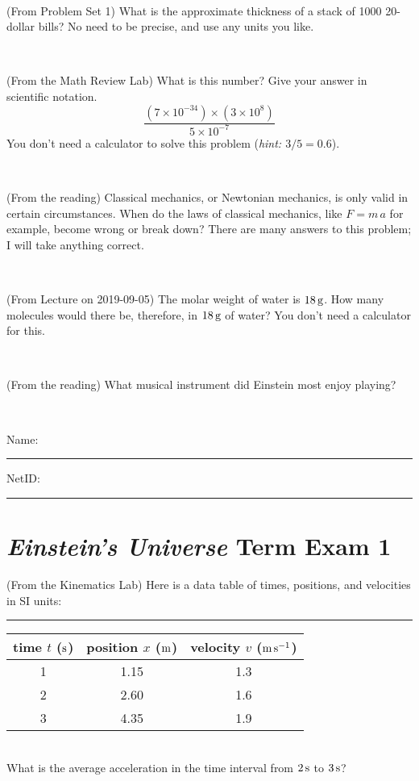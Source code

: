 \documentclass[12pt, letterpaper]{article}
\begin{document}
\vfill ~

\begin{problem} (From Problem Set 1)
What is the approximate thickness of a stack of 1000 20-dollar bills?
No need to be precise, and use any units you like.
\end{problem}


\vfill ~


\clearpage


\begin{problem} (From the Math Review Lab)
What is this number? Give your answer in scientific notation.
$$
\frac{(7\times10^{-34})\times(3\times10^8)}{5\times10^{-7}}
$$
You don't need a calculator to solve this problem (\textit{hint: $3/5=0.6$}).
\end{problem}


\vfill ~

\begin{problem} (From the reading)
Classical mechanics, or Newtonian mechanics, is only valid in certain
circumstances. When do the laws of classical mechanics, like $F =
m\,a$ for example, become wrong or break down? There are many answers
to this problem; I will take anything correct.
\end{problem}


\vfill ~

\begin{problem} (From Lecture on 2019-09-05)
The molar weight of water is $18\,\mathrm{g}$. How many molecules would there
be, therefore, in $18\,\mathrm{g}$ of water? You don't need a calculator for
this.
\end{problem}


\vfill ~

\begin{problem} (From the reading)
What musical instrument did Einstein most enjoy playing?
\end{problem}


\vfill ~


\cleardoublepage



\noindent
Name: \rule[-1ex]{0.60\textwidth}{0.1pt}
NetID: \rule[-1ex]{0.20\textwidth}{0.1pt}

\section*{\textsl{Einstein's Universe} Term Exam 1}
\setcounter{problem}{1}


\begin{problem} (From the Kinematics Lab)
Here is a data table of times, positions, and velocities in SI units:\\
\rule{1.0in}{0pt}\begin{tabular}{c|c|c}
time $t$ ($\mathrm{s}$) & position $x$ ($\mathrm{m}$) & velocity $v$ ($\mathrm{m}\,\mathrm{s}^{-1}$) \\
\hline
1 & 1.15 & 1.3 \\
2 & 2.60 & 1.6 \\
3 & 4.35 & 1.9 \\
\hline
\end{tabular}\\
What is the average acceleration in the time interval from $2\,\mathrm{s}$ to $3\,\mathrm{s}$?
\end{problem}
\end{document}
